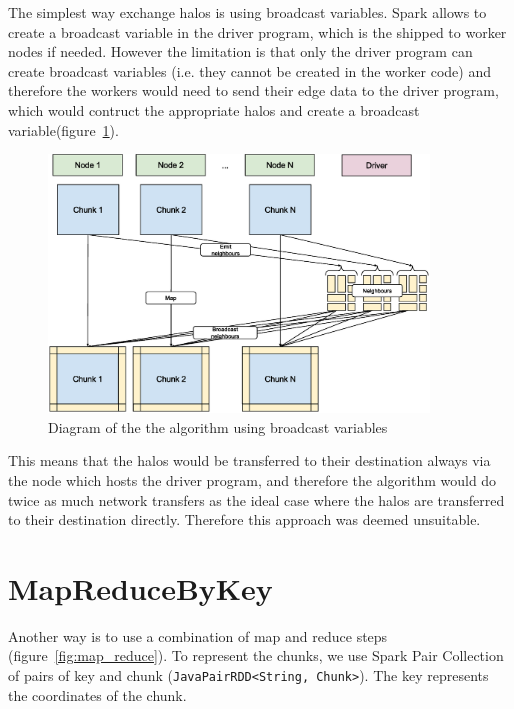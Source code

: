 \documentclass{l4proj}
\begin{document}
The simplest way exchange halos is using broadcast variables. Spark allows to
create a broadcast variable in the driver program, which is the shipped to worker
nodes if needed. However the limitation is that only the driver program can create
broadcast variables (i.e. they cannot be created in the worker code) and therefore
the workers would need to send their edge data to the driver program, which would
contruct the appropriate halos and create a broadcast variable(figure~\ref{fig:broadcast}).

\begin{figure}
\centering
\includegraphics[width=0.9\textwidth]{images/Broadcast_variable.eps}
\caption{Diagram of the the algorithm using broadcast variables}
\label{fig:broadcast}
\end{figure}

This means that the halos would be transferred to their destination always via
the node which hosts the driver program, and therefore the algorithm would do 
twice as much network transfers as the ideal case where the halos are transferred
to their destination directly. Therefore this approach was deemed unsuitable. 

\section{MapReduceByKey}

Another way is to use a combination of map and reduce steps (figure~\ref{fig:map_reduce}). To represent the 
chunks, we use Spark Pair Collection of pairs of key and chunk (\texttt{JavaPairRDD<String, Chunk>}). The key represents
the coordinates of the chunk.
\end{document}
